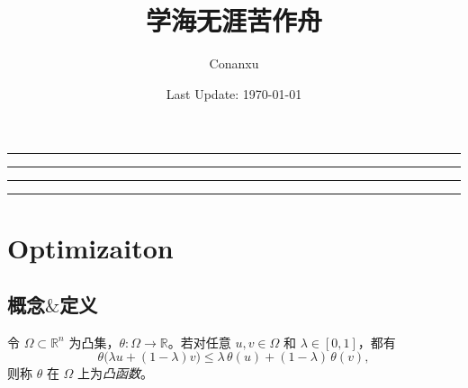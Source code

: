\newtheorem{que}{问题}[section]
\newtheorem{example}{示例}[section]
\newtheorem{property}{性质}[section]
\newcommand{\alert}[1]{\textcolor{red}{\textbf{#1}}}
\makeatletter
\renewcommand*{\maketitle}{
\begin{titlepage}
\centering
\vspace*{5\baselineskip}

\rule{\textwidth}{1.6pt}\vspace*{-\baselineskip}\vspace*{2pt}
\rule{\textwidth}{0.4pt}

\vspace{0.75\baselineskip}

{\LARGE\bfseries \@title}

\vspace{0.75\baselineskip}

\rule{\textwidth}{0.4pt}\vspace*{-\baselineskip}\vspace{3.2pt}
\rule{\textwidth}{1.6pt}

\vspace{4\baselineskip}

{\Large \@author}

\vspace{0.35\baselineskip}	

{\Large \@date}
\vfill
\end{titlepage}
}
\makeatother
\title{学海无涯苦作舟 \\[20pt]
\Large 
}
\author{Conanxu}
\date{Last Update: \today}

\maketitle
\clearpage
\tableofcontents  %
\clearpage
{}
\chapter{Optimizaiton}
\section{概念$\&$定义}
\begin{definition}[凸函数]\label{def:convex}
	令 $\Omega\subset\mathbb R^n$ 为凸集，$\theta:\Omega\to\mathbb R$。若对任意 $u,v\in\Omega$ 和 $\lambda\in[0,1]$，都有
	\[
	\theta\bigl(\lambda u + (1-\lambda) v\bigr)
	\le \lambda\,\theta(u) + (1-\lambda)\,\theta(v),
	\]
	则称 $\theta$ 在 $\Omega$ 上为\emph{凸函数}。
\end{definition}

